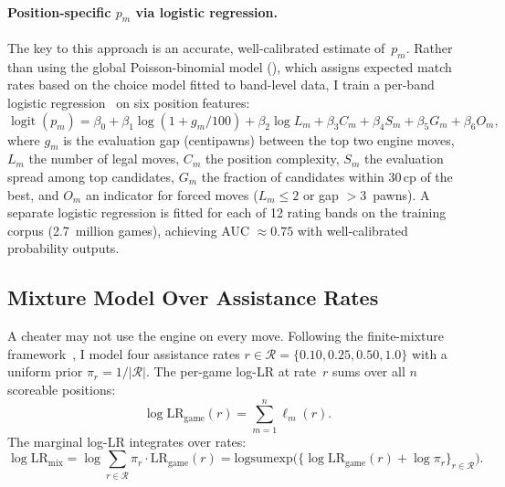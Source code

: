 \documentclass[11pt,a4paper]{article}
\DeclareMathOperator{\logit}{logit}
\theoremstyle{definition}
\begin{document}
\paragraph{Position-specific $p_m$ via logistic regression.}
The key to this approach is an accurate, well-calibrated estimate
of~$p_m$.  Rather than using the global Poisson-binomial
model (), which assigns expected match rates
based on the choice model fitted to band-level data, I train a
per-band logistic regression~\citep{hosmer2013applied} on six position features:
\begin{equation}
  \label{eq:logistic}
  \logit(p_m) = \beta_0 + \beta_1 \log(1+g_m/100)
    + \beta_2 \log L_m + \beta_3 C_m + \beta_4 S_m
    + \beta_5 G_m + \beta_6 O_m,
\end{equation}
where $g_m$ is the evaluation gap (centipawns) between the top two
engine moves, $L_m$ the number of legal moves, $C_m$ the position
complexity, $S_m$ the evaluation spread among top candidates, $G_m$ the
fraction of candidates within 30\,cp of the best, and $O_m$ an
indicator for forced moves ($L_m \le 2$ or gap $> 3$~pawns).  A
separate logistic regression is fitted for each of 12 rating bands on
the training corpus (2.7~million games), achieving AUC $\approx 0.75$
with well-calibrated probability outputs.

\subsection{Mixture Model Over Assistance Rates}
\label{sec:mixture}

A cheater may not use the engine on every move.  Following the
finite-mixture framework~\citep{mclachlan2000finite}, I model four
assistance rates $r \in \mathcal{R} = \{0.10, 0.25, 0.50, 1.0\}$
with a uniform prior $\pi_r = 1/|\mathcal{R}|$.  The per-game log-LR
at rate~$r$ sums over all $n$ scoreable positions:
\begin{equation}
  \label{eq:game-rate-lr}
  \log \mathrm{LR}_{\mathrm{game}}(r)
  = \sum_{m=1}^{n} \ell_m(r).
\end{equation}
The marginal log-LR integrates over rates:
\begin{equation}
  \label{eq:mixture}
  \log \mathrm{LR}_{\mathrm{mix}}
  = \log \sum_{r \in \mathcal{R}} \pi_r \cdot \mathrm{LR}_{\mathrm{game}}(r)
  = \mathrm{logsumexp}\!\bigl(
      \{\log \mathrm{LR}_{\mathrm{game}}(r) + \log \pi_r\}_{r \in \mathcal{R}}\bigr).
\end{equation}
\end{document}
